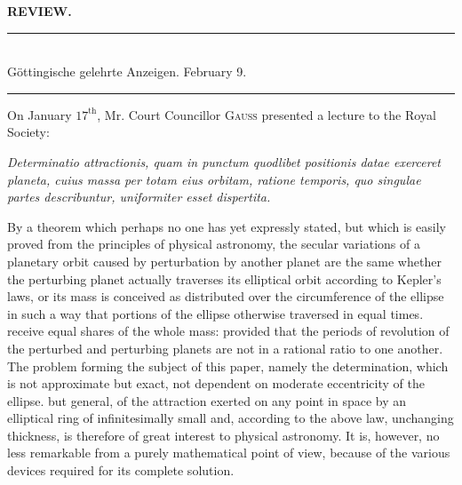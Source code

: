 \begingroup
\renewcommand{\arraystretch}{1.45}
\clearpage{}
\begin{center}
\textbf{REVIEW.}
\end{center}
\begin{center}
\rule{0.62\linewidth}{0.4pt}\\[6pt]
Göttingische gelehrte Anzeigen. February 9.\\[6pt]
\rule{0.62\linewidth}{0.4pt}
\end{center}

On January $17^{\mathrm{th}}$, Mr. Court Councillor \textsc{Gauss} presented a lecture to the Royal Society:

\begin{center}
\textit{Determinatio attractionis, quam in punctum quodlibet positionis datae exerceret
planeta, cuius massa per totam eius orbitam, ratione temporis, quo singulae partes
describuntur, uniformiter esset dispertita.}
\end{center}

By a theorem which perhaps no one has yet expressly stated, but which is easily proved from the principles of physical astronomy, the secular variations of a planetary orbit caused by perturbation by another planet are the same whether the perturbing planet actually traverses its elliptical orbit according to Kepler's laws, or its mass is conceived as distributed over the circumference of the ellipse in such a way that portions of the ellipse otherwise traversed in equal times. receive equal shares of the whole mass: provided that the periods of revolution of the perturbed and perturbing planets are not in a rational ratio to one another. The problem forming the subject of this paper, namely the determination, which is not approximate but exact, not dependent on moderate eccentricity of the ellipse. but general, of the attraction exerted on any point in space by an elliptical ring of infinitesimally small and, according to the above
law, unchanging thickness, is therefore of great interest to physical astronomy. It is, however, no less remarkable from a purely mathematical point of view, because of the various devices required for its complete solution.

